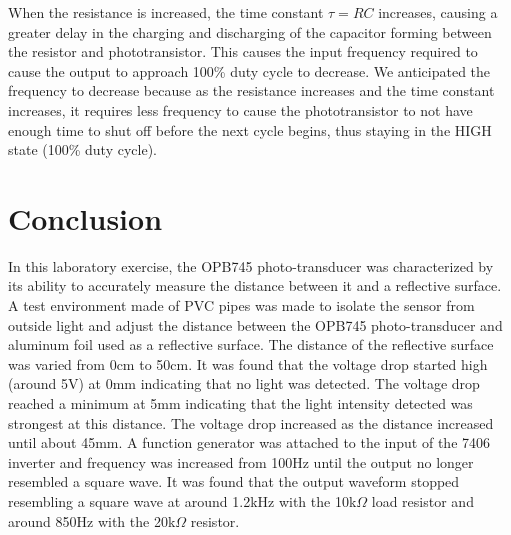 \documentclass[CMPE]{KGCOEReport}
\begin{document}
When the resistance is increased, the time constant $\tau=RC$ increases, causing a greater delay in the charging and discharging of the capacitor forming between the resistor and phototransistor. This causes the input frequency required to cause the output to approach 100\% duty cycle to decrease. We anticipated the frequency to decrease because as the resistance increases and the time constant increases, it requires less frequency to cause the phototransistor to not have enough time to shut off before the next cycle begins, thus staying in the HIGH state (100\% duty cycle).

\section*{Conclusion}

In this laboratory exercise, the OPB745 photo-transducer was characterized by its ability to accurately measure the distance between it and a reflective surface. A test environment made of PVC pipes was made to isolate the sensor from outside light and adjust the distance between the OPB745 photo-transducer and aluminum foil used as a reflective surface. The distance of the reflective surface was varied from 0cm to 50cm. It was found that the voltage drop started high (around 5V) at 0mm indicating that no light was detected. The voltage drop reached a minimum at 5mm indicating that the light intensity detected was strongest at this distance. The voltage drop increased as the distance increased until about 45mm. A function generator was attached to the input of the 7406 inverter and frequency was increased from 100Hz until the output no longer resembled a square wave. It was found that the output waveform stopped resembling a square wave at around 1.2kHz with the 10k$\Omega$ load resistor and around 850Hz with the 20k$\Omega$ resistor.
\end{document}
